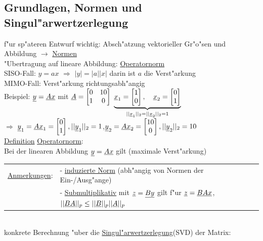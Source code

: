 \documentclass[openany,a4paper,11pt]{book}
\begin{document}
\subsection{Grundlagen, Normen und Singul"arwertzerlegung}
f"ur sp"ateren Entwurf wichtig: Absch"atzung vektorieller Gr"o"sen und Abbildung $\rightarrow$ \uline{Normen} \\
"Ubertragung auf lineare Abbildung: \uline{Operatornorm}\\
SISO-Fall: $y=ax$ $\Rightarrow$ $|y|=|a||x|$ darin ist $a$ die Verst"arkung\\
MIMO-Fall: Verst"arkung richtungsabh"angig\\
Beispiel: $\uline{y}=\uline{Ax}$ mit $\uline{A}=\begin{bmatrix} 0&10\\1&0\\\end{bmatrix}$ \quad $\underbrace{\uline{x}_1=\begin{bmatrix}1\\0\end{bmatrix},\quad \uline{x}_2=\begin{bmatrix}0\\1\end{bmatrix}}_{||\uline{x}_1||_2=||\uline{x}_2||_2=1}$\\
$\Rightarrow$ $\uline{y}_1=\uline{Ax}_1=\begin{bmatrix}0\\1\end{bmatrix}, ||\uline{y}_1||_2=1$,\quad $\uline{y}_2=\uline{Ax}_2=\begin{bmatrix}10\\0\end{bmatrix}, ||\uline{y}_2||_2=10$\\
\uline{Definition} \uline{Operatornorm}: \\
Bei der linearen Abbildung $\uline{y}=\uline{Ax}$ gilt  (maximale Verst"arkung)
\begin{tabular}{ll}
    \uline{Anmerkungen}:& - \uline{induzierte Norm} (abh"angig von Normen der Ein-/Ausg"ange)\\
    & - \uline{Submultiplikativ} mit $\uline{z}=\uline{By}$ gilt f"ur $\uline{z}=\uline{BAx}$,\quad $||\uline{BA}||_p\leq||\uline{B}||_p||\uline{A}||_p$ 
\end{tabular}\\
konkrete Berechnung "uber die \uline{Singul"arwertzerlegung}(SVD) der Matrix: \\
\end{document}
